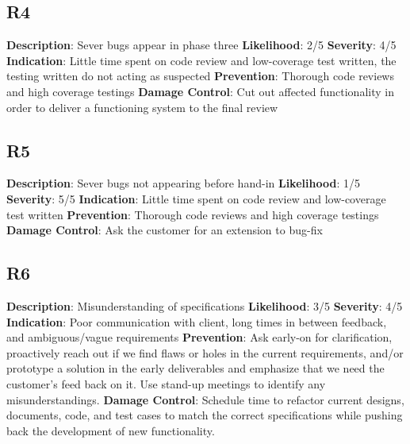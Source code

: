 \documentclass{article}
\begin{document}
\subsection{R4}
\textbf{Description}: Sever bugs appear in phase three \newline
\textbf{Likelihood}: 2/5\newline
\textbf{Severity}: 4/5  \newline
\textbf{Indication}: Little time spent on code review and low-coverage test written, the testing written do not acting as suspected \newline
\textbf{Prevention}: Thorough code reviews and high coverage testings \newline
\textbf{Damage Control}: Cut out affected functionality in order to deliver a functioning system to the final review \newline

\subsection{R5}
\textbf{Description}: Sever bugs not appearing before hand-in \newline
\textbf{Likelihood}: 1/5\newline
\textbf{Severity}: 5/5  \newline
\textbf{Indication}: Little time spent on code review and low-coverage test written \newline
\textbf{Prevention}: Thorough code reviews and high coverage testings \newline
\textbf{Damage Control}: Ask the customer for an extension to bug-fix \newline

\subsection{R6}
\textbf{Description}: Misunderstanding of specifications \newline
\textbf{Likelihood}: 3/5\newline
\textbf{Severity}: 4/5 \newline
\textbf{Indication}: Poor communication with client, long times in between feedback, and ambiguous/vague requirements \newline
\textbf{Prevention}: Ask early-on for clarification, proactively reach out if we find flaws or holes in the current requirements, and/or prototype a solution in the early deliverables and emphasize that we need the customer's feed back on it. Use stand-up meetings to identify any misunderstandings.\newline
\textbf{Damage Control}: Schedule time to refactor current designs, documents, code, and test cases to match the correct specifications while pushing back the development of new functionality. \newline
\end{document}
